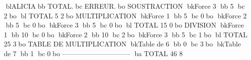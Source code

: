 blALICIAbb           TOTAL.bc      ERREUR.bo
SOUSTRACTION
bkForce      3     bb  5	bc        2bo
bl TOTAL             5	        2bo
MULTIPLICATION
bkForce      1     bb  5	bc        0bo
bkForce      2     bb  5	bc        0bo
bkForce      3     bb  5	bc        0bo
bl TOTAL            15	        0bo
DIVISION
bkForce      1     bb 10	bc        0bo
bkForce      2     bb 10	bc        2bo
bkForce      3     bb  5	bc        1bo
bl TOTAL            25	        3bo
TABLE DE MULTIPLICATION
bkTable de   6     bb  0	bc        3bo
bkTable de   7     bb  1	bc        0bo
------------------------------
ba TOTAL            46	        8
